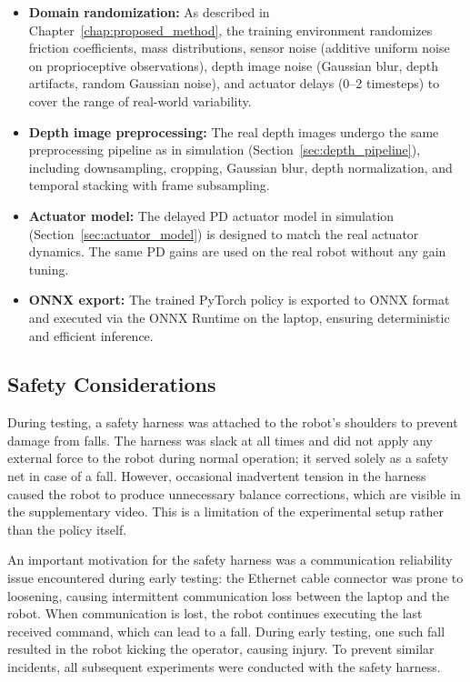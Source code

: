 \begin{itemize}
    \item \textbf{Domain randomization:} As described in Chapter~\ref{chap:proposed_method}, the training environment randomizes friction coefficients, mass distributions, sensor noise (additive uniform noise on proprioceptive observations), depth image noise (Gaussian blur, depth artifacts, random Gaussian noise), and actuator delays (0--2 timesteps) to cover the range of real-world variability.
    \item \textbf{Depth image preprocessing:} The real depth images undergo the same preprocessing pipeline as in simulation (Section~\ref{sec:depth_pipeline}), including downsampling, cropping, Gaussian blur, depth normalization, and temporal stacking with frame subsampling.
    \item \textbf{Actuator model:} The delayed PD actuator model in simulation (Section~\ref{sec:actuator_model}) is designed to match the real actuator dynamics. The same PD gains are used on the real robot without any gain tuning.
    \item \textbf{ONNX export:} The trained PyTorch policy is exported to ONNX format and executed via the ONNX Runtime on the laptop, ensuring deterministic and efficient inference.
\end{itemize}

\subsection{Safety Considerations}
\label{sec:safety}

During testing, a safety harness was attached to the robot's shoulders to prevent damage from falls. The harness was slack at all times and did not apply any external force to the robot during normal operation; it served solely as a safety net in case of a fall. However, occasional inadvertent tension in the harness caused the robot to produce unnecessary balance corrections, which are visible in the supplementary video. This is a limitation of the experimental setup rather than the policy itself.

An important motivation for the safety harness was a communication reliability issue encountered during early testing: the Ethernet cable connector was prone to loosening, causing intermittent communication loss between the laptop and the robot. When communication is lost, the robot continues executing the last received command, which can lead to a fall. During early testing, one such fall resulted in the robot kicking the operator, causing injury. To prevent similar incidents, all subsequent experiments were conducted with the safety harness.

